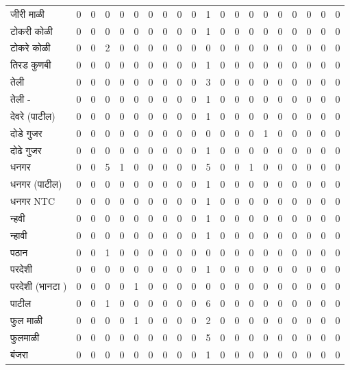 \documentclass{article}
\begin{document}
\begin{table}
\begin{tabular}{lrrrrrrrrrrrrrrrrrrr}
जीरी माळी & 0 & 0 & 0 & 0 & 0 & 0 & 0 & 0 & 0 & 1 & 0 & 0 & 0 & 0 & 0 & 0 & 0 & 0 & 0 \\
टोकरी कोळी & 0 & 0 & 0 & 0 & 0 & 0 & 0 & 0 & 0 & 1 & 0 & 0 & 0 & 0 & 0 & 0 & 0 & 0 & 0 \\
टोकरे कोळी & 0 & 0 & 2 & 0 & 0 & 0 & 0 & 0 & 0 & 0 & 0 & 0 & 0 & 0 & 0 & 0 & 0 & 0 & 0 \\
तिरड कुणबी & 0 & 0 & 0 & 0 & 0 & 0 & 0 & 0 & 0 & 1 & 0 & 0 & 0 & 0 & 0 & 0 & 0 & 0 & 0 \\
तेली & 0 & 0 & 0 & 0 & 0 & 0 & 0 & 0 & 0 & 3 & 0 & 0 & 0 & 0 & 0 & 0 & 0 & 0 & 0 \\
तेली - & 0 & 0 & 0 & 0 & 0 & 0 & 0 & 0 & 0 & 1 & 0 & 0 & 0 & 0 & 0 & 0 & 0 & 0 & 0 \\
देवरे (पाटील) & 0 & 0 & 0 & 0 & 0 & 0 & 0 & 0 & 0 & 1 & 0 & 0 & 0 & 0 & 0 & 0 & 0 & 0 & 0 \\
दोडे गुजर & 0 & 0 & 0 & 0 & 0 & 0 & 0 & 0 & 0 & 0 & 0 & 0 & 0 & 1 & 0 & 0 & 0 & 0 & 0 \\
दोढे गुजर & 0 & 0 & 0 & 0 & 0 & 0 & 0 & 0 & 0 & 1 & 0 & 0 & 0 & 0 & 0 & 0 & 0 & 0 & 0 \\
धनगर & 0 & 0 & 5 & 1 & 0 & 0 & 0 & 0 & 0 & 5 & 0 & 0 & 1 & 0 & 0 & 0 & 0 & 0 & 0 \\
धनगर (पाटील) & 0 & 0 & 0 & 0 & 0 & 0 & 0 & 0 & 0 & 1 & 0 & 0 & 0 & 0 & 0 & 0 & 0 & 0 & 0 \\
धनगर NTC & 0 & 0 & 0 & 0 & 0 & 0 & 0 & 0 & 0 & 1 & 0 & 0 & 0 & 0 & 0 & 0 & 0 & 0 & 0 \\
न्हवी & 0 & 0 & 0 & 0 & 0 & 0 & 0 & 0 & 0 & 1 & 0 & 0 & 0 & 0 & 0 & 0 & 0 & 0 & 0 \\
न्हावी & 0 & 0 & 0 & 0 & 0 & 0 & 0 & 0 & 0 & 1 & 0 & 0 & 0 & 0 & 0 & 0 & 0 & 0 & 0 \\
पठान & 0 & 0 & 1 & 0 & 0 & 0 & 0 & 0 & 0 & 0 & 0 & 0 & 0 & 0 & 0 & 0 & 0 & 0 & 0 \\
परदेशी & 0 & 0 & 0 & 0 & 0 & 0 & 0 & 0 & 0 & 1 & 0 & 0 & 0 & 0 & 0 & 0 & 0 & 0 & 0 \\
परदेशी (भानटा ) & 0 & 0 & 0 & 0 & 1 & 0 & 0 & 0 & 0 & 0 & 0 & 0 & 0 & 0 & 0 & 0 & 0 & 0 & 0 \\
पाटील & 0 & 0 & 1 & 0 & 0 & 0 & 0 & 0 & 0 & 6 & 0 & 0 & 0 & 0 & 0 & 0 & 0 & 0 & 0 \\
फुल माळी & 0 & 0 & 0 & 0 & 1 & 0 & 0 & 0 & 0 & 2 & 0 & 0 & 0 & 0 & 0 & 0 & 0 & 0 & 0 \\
फुलमाळी & 0 & 0 & 0 & 0 & 0 & 0 & 0 & 0 & 0 & 5 & 0 & 0 & 0 & 0 & 0 & 0 & 0 & 0 & 0 \\
बंजरा & 0 & 0 & 0 & 0 & 0 & 0 & 0 & 0 & 0 & 1 & 0 & 0 & 0 & 0 & 0 & 0 & 0 & 0 & 0 \\

\end{tabular}
\end{table}
\end{document}
